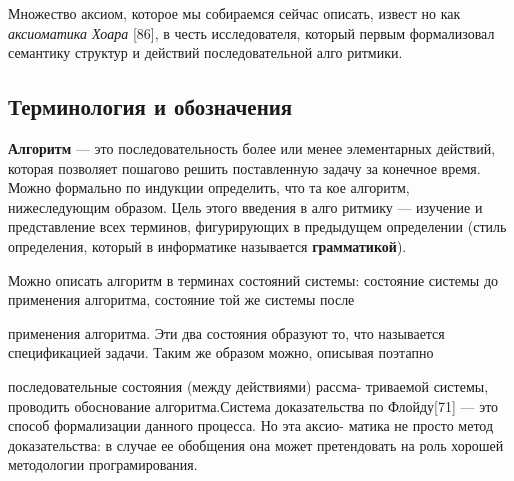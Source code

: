 	Множество аксиом, которое мы собираемся сейчас описать, извест­
	но как \textit{аксиоматика Хоара} [86], в честь исследователя, который первым
	формализовал семантику структур и действий последовательной алго
	ритмики.
	
	\subsection{Терминология и обозначения}
	
	\noindent \textbf{Алгоритм} — это последовательность более или менее элементарных
	действий, которая позволяет пошагово решить поставленную задачу за
	конечное время. Можно формально по индукции определить, что та­
	кое алгоритм, нижеследующим образом. Цель этого введения в алго­
	ритмику — изучение и представление всех терминов, фигурирующих в
	предыдущем определении (стиль определения, который в информатике
	называется \textbf{грамматикой}).
	
	Можно описать алгоритм в терминах состояний системы: состояние\linebreak
	системы\: до\: применения\: алгоритма,\: состояние\: той\: же\: системы\: после
	\pagebreak
	
\noindent применения алгоритма. Эти два состояния образуют то, что называет­ся спецификацией задачи.\: Таким\: же\: образом\: можно,\: описывая\: поэтапно

\noindent последовательные состоя­ния\linebreak
(между действиями) рассма-­\linebreak
триваемой системы, проводить обоснование алгоритма.Систе­ма доказательства по Флой­ду[71] --- это способ формализа­ции 
данного процесса. Но эта ак­сио-
\noindent матика не просто метод дока­зательства: в случае ее обобще­ния она может претендовать на роль хорошей методологии програмирования.
\newline

